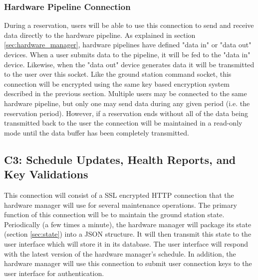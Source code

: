 \documentclass{mxl-design}
\begin{document}
\subsubsection{Hardware Pipeline Connection}
During a reservation, users will be able to use this connection to send and receive data directly to the hardware pipeline. As explained in section \ref{sec:hardware_manager}, hardware pipelines have defined "data in" or "data out" devices. When a user submits data to the pipeline, it will be fed to the "data in" device. Likewise, when the "data out" device generates data it will be transmitted to the user over this socket. Like the ground station command socket, this connection will be encrypted using the same key based encryption system described in the previous section. Multiple users may be connected to the same hardware pipeline, but only one may send data during any given period (i.e. the reservation period). However, if a reservation ends without all of the data being transmitted back to the user the connection will be maintained in a read-only mode until the data buffer has been completely transmitted.

\subsection{C3: Schedule Updates, Health Reports, and Key Validations}
\label{sec:connection_c3}
This connection will consist of a SSL encrypted HTTP connection that the hardware manager will use for several maintenance operations. The primary function of this connection will be to maintain the ground station state. Periodically (a few times a minute), the hardware manager will package its state (section \ref{sec:state}) into a JSON structure. It will then transmit this state to the user interface which will store it in its database. The user interface will respond with the latest version of the hardware manager's schedule. In addition, the hardware manager will use this connection to submit user connection keys to the user interface for authentication. 

\end{document}
